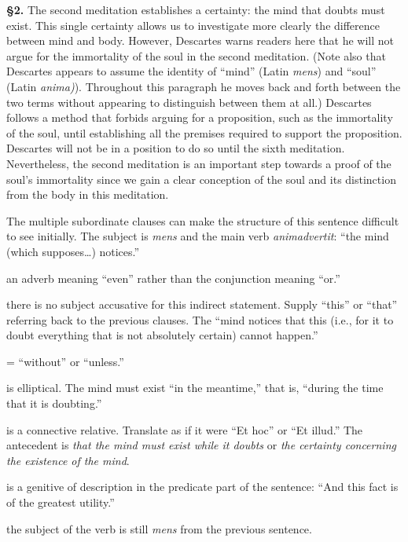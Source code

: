\prenotes

\textbf{§2.} The second meditation establishes a certainty: the mind that doubts must exist. This single certainty allows us to investigate more clearly the difference between mind and body. However, Descartes warns readers here that he will not argue for the immortality of the soul in the second meditation. (Note also that Descartes appears to assume the identity of ``mind'' (Latin \textit{mens}) and ``soul'' (Latin \textit{anima)}). Throughout this paragraph he moves back and forth between the two terms without appearing to distinguish between them at all.)  Descartes follows a method that forbids arguing for a proposition, such as the immortality of the soul, until establishing all the premises required to support the proposition. Descartes will not be in a position to do so until the sixth meditation. Nevertheless, the second meditation is an important step towards a proof of the soul's immortality since we gain a clear conception of the soul and its distinction from the body in this meditation.

 The multiple subordinate clauses can make the structure of this sentence difficult to see initially. The subject is \textit{mens} and the main verb \textit{animadvertit}: ``the mind (which supposes\dots) notices.''

 an adverb meaning ``even'' rather than the conjunction meaning ``or.''

 there is no subject accusative for this indirect statement. Supply ``this'' or ``that'' referring back to the previous clauses. The ``mind notices that this (i.e., for it to doubt everything that is not absolutely certain) cannot happen.''

 = ``without'' or ``unless.''

 is elliptical. The mind must exist ``in the meantime,'' that is, ``during the time that it is doubting.''

 is a connective relative. Translate as if it were ``Et hoc'' or ``Et illud.'' The antecedent is \textit{that the mind must exist while it doubts} or \textit{the certainty concerning the existence of the mind}.

 is a genitive of description in the predicate part of the sentence: ``And this fact is of the greatest utility.''

 the subject of the verb is still \textit{mens} from the previous sentence.


